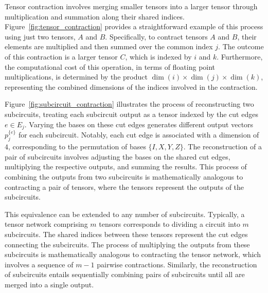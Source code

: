 Tensor contraction involves merging smaller tensors into a larger tensor through multiplication and summation along their shared indices.
Figure~\ref{fig:tensor_contraction} provides a straightforward example of this process using just two tensors, $A$ and $B$.
Specifically, to contract tensors $A$ and $B$,
their elements are multiplied and then summed over the common index $j$.
The outcome of this contraction is a larger tensor $C$,
which is indexed by $i$ and $k$.
Furthermore, the computational cost of this operation,
in terms of floating point multiplications,
is determined by the product $\dim(i) \times \dim(j) \times \dim(k)$,
representing the combined dimensions of the indices involved in the contraction.

Figure~\ref{fig:subcircuit_contraction} illustrates the process of reconstructing two subcircuits,
treating each subcircuit output as a tensor indexed by the cut edges $e\in E_j$.
Varying the bases on these cut edges generates different output vectors $p_j^{\{e\}}$ for each subcircuit.
Notably, each cut edge is associated with a dimension of $4$,
corresponding to the permutation of bases $\{I,X,Y,Z\}$.
The reconstruction of a pair of subcircuits involves adjusting the bases on the shared cut edges,
multiplying the respective outputs,
and summing the results.
This process of combining the outputs from two subcircuits is mathematically analogous to contracting a pair of tensors,
where the tensors represent the outputs of the subcircuits.

This equivalence can be extended to any number of subcircuits.
Typically, a tensor network comprising $m$ tensors corresponds to dividing a circuit into $m$ subcircuits.
The shared indices between these tensors represent the cut edges connecting the subcircuits.
The process of multiplying the outputs from these subcircuits is mathematically analogous to contracting the tensor network,
which involves a sequence of $m-1$ pairwise contractions.
Similarly, the reconstruction of subcircuits entails sequentially combining pairs of subcircuits until all are merged into a single output.